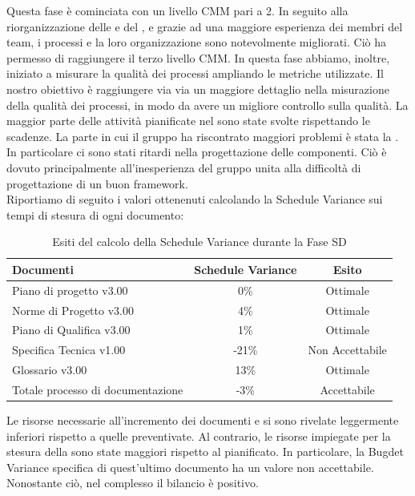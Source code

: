 			Questa fase è cominciata con un livello CMM pari a 2. In seguito alla riorganizzazione delle  e del , e grazie ad una maggiore esperienza dei membri del team, i processi e la loro organizzazione sono notevolmente migliorati. Ciò ha permesso di raggiungere il terzo livello CMM. In questa fase abbiamo, inoltre, iniziato a misurare la qualità dei processi ampliando le metriche utilizzate. Il nostro obiettivo è raggiungere via via un maggiore dettaglio nella misurazione della qualità dei processi, in modo da avere un migliore controllo sulla qualità.
			La maggior parte delle attività pianificate nel  sono state svolte rispettando le scadenze. La parte in cui il gruppo ha riscontrato maggiori problemi è stata la . In particolare ci sono stati ritardi nella progettazione delle componenti. Ciò è dovuto principalmente all'inesperienza del gruppo unita alla difficoltà di progettazione di un buon framework.\\
			Riportiamo di seguito i valori ottenenuti calcolando la Schedule Variance sui tempi di stesura di ogni documento:
			\begin{table}[H]
					\centering
					\begin{tabu}{| l | c | c |}
							\hline
							Documenti 							& Schedule Variance	& Esito		\\ \hline \hline
							
							Piano di progetto v3.00				& 0\% 		& Ottimale  \\ \hline
							Norme di Progetto v3.00 			& 4\%		& Ottimale  \\ \hline
							Piano di Qualifica v3.00 			& 1\%		& Ottimale  \\ \hline
							Specifica Tecnica v1.00 			& -21\%		& Non Accettabile  \\ \hline
							Glossario v3.00					 	& 13\% 		& Ottimale  \\ \hline
							Totale processo di documentazione & -3\% & Accettabile \\ \hline
						\end{tabu}
					\caption{Esiti del calcolo della Schedule Variance durante la Fase SD}
				\end{table}
			Le risorse necessarie all'incremento dei documenti  e  si sono rivelate leggermente inferiori rispetto a quelle preventivate. Al contrario, le risorse impiegate per la stesura della  sono state maggiori rispetto al pianificato. In particolare, la Bugdet Variance specifica di quest'ultimo documento ha un valore non accettabile. Nonostante ciò, nel complesso il bilancio è positivo.\\
